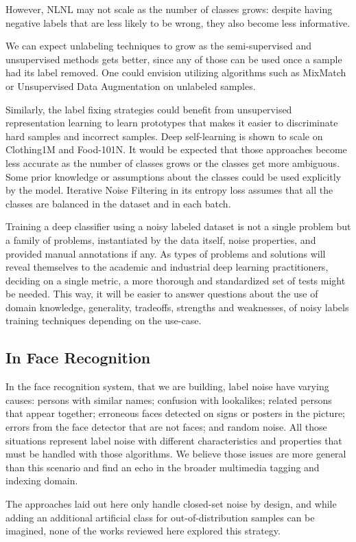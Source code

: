 However, NLNL \citep{NLNL} may not scale as the number of classes grows: despite having negative labels that are less likely to be wrong, they also become less informative. 

We can expect unlabeling techniques to grow as the semi-supervised and unsupervised methods gets better, since any of those can be used once a sample had its label removed. One could envision utilizing algorithms such as MixMatch \citep{MixMatch} or Unsupervised Data Augmentation \citep{UDA} on unlabeled samples.

Similarly, the label fixing strategies could benefit from unsupervised representation learning to learn prototypes that makes it easier to discriminate hard samples and incorrect samples. Deep self-learning \citep{SelfLearning} is shown to scale on Clothing1M and Food-101N. It would be expected that those approaches become less accurate as the number of classes grows or the classes get more ambiguous. Some prior knowledge or assumptions about the classes could be used explicitly by the model. Iterative Noise Filtering \citep{IterativeNoiseFiltering} in its entropy loss assumes that all the classes are balanced in the dataset and in each batch.

Training a deep classifier using a noisy labeled dataset is not a single problem but a family of problems, instantiated by the data itself, noise properties, and provided manual annotations if any. As types of problems and solutions will reveal themselves to the academic and industrial deep learning practitioners, deciding on a single metric, a more thorough and standardized set of tests might be needed. This way, it will be easier to answer questions about the use of domain knowledge, generality, tradeoffs, strengths and weaknesses, of noisy labels training techniques depending on the use-case.

\subsection{In Face Recognition} %

In the face recognition system, that we are building, label noise have varying causes: persons with similar names; confusion with lookalikes; related persons that appear together; erroneous faces detected on signs or posters in the picture; errors from the face detector that are not faces; and random noise. All those situations represent label noise with different characteristics and properties that must be handled with those algorithms. We believe those issues are more general than this scenario and find an echo in the broader multimedia tagging and indexing domain.

The approaches laid out here only handle closed-set noise by design, and while adding an additional artificial class for out-of-distribution samples can be imagined, none of the works reviewed here explored this strategy.